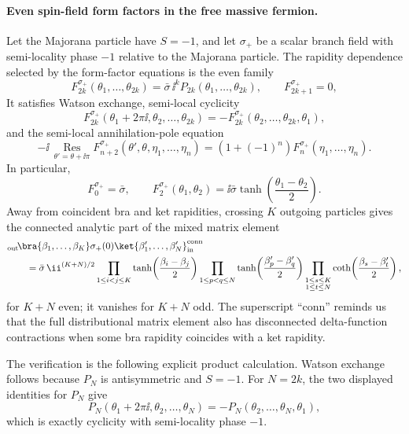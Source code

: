 \paragraph{Even spin-field form factors in the free massive fermion.}
Let the Majorana particle have \(S=-1\), and let \(\sigma_+\) be a scalar
branch field with semi-locality phase \(-1\) relative to the Majorana
particle.  The rapidity dependence selected by the form-factor equations is
the even family
\begin{equation}
  F_{2k}^{\sigma_+}(\theta_1,\ldots,\theta_{2k})
  =
  \bar\sigma\,\ii^k P_{2k}(\theta_1,\ldots,\theta_{2k}),
  \qquad
  F_{2k+1}^{\sigma_+}=0 ,
  \label{eq:ising-spin-even-form-factors}
\end{equation}
It satisfies Watson exchange, semi-local cyclicity
\[
  F_{2k}^{\sigma_+}(\theta_1+2\pi\ii,\theta_2,\ldots,\theta_{2k})
  =
  -F_{2k}^{\sigma_+}(\theta_2,\ldots,\theta_{2k},\theta_1),
\]
and the semi-local annihilation-pole equation
\[
  -\ii\,\operatorname*{Res}_{\theta'=\theta+\ii\pi}
  F_{n+2}^{\sigma_+}(\theta',\theta,\eta_1,\ldots,\eta_n)
  =
  \left(1+(-1)^n\right)
  F_n^{\sigma_+}(\eta_1,\ldots,\eta_n).
\]
In particular,
\[
  F_0^{\sigma_+}=\bar\sigma,\qquad
  F_2^{\sigma_+}(\theta_1,\theta_2)
  =
  \ii\bar\sigma
  \tanh\!\left(\frac{\theta_1-\theta_2}{2}\right).
\]
Away from coincident bra and ket rapidities, crossing \(K\) outgoing
particles gives the connected analytic part of the mixed matrix element
\begin{align}
  &{}_{\rm out}\!\bra{\beta_1,\ldots,\beta_K}
  \sigma_+(0)
  \ket{\beta'_1,\ldots,\beta'_N}_{\rm in}^{\rm conn}
  \notag\\
  &\qquad =
  \bar\sigma\,\ii^{(K+N)/2}
  \prod_{1\le i<j\le K}
  \tanh\!\left(\frac{\beta_i-\beta_j}{2}\right)
  \prod_{1\le p<q\le N}
  \tanh\!\left(\frac{\beta'_p-\beta'_q}{2}\right)
  \prod_{\substack{1\le s\le K\\1\le t\le N}}
  \coth\!\left(\frac{\beta_s-\beta'_t}{2}\right),
  \label{eq:ising-spin-mixed-fz-form-factor}
\end{align}
for \(K+N\) even; it vanishes for \(K+N\) odd.  The superscript
``conn'' reminds us that the full distributional matrix element also has
disconnected delta-function contractions when some bra rapidity coincides
with a ket rapidity.

The verification is the following explicit product calculation.  Watson
exchange follows because \(P_N\) is antisymmetric and \(S=-1\).
For \(N=2k\), the two displayed identities for \(P_N\) give
\[
  P_N(\theta_1+2\pi\ii,\theta_2,\ldots,\theta_N)
  =
  -P_N(\theta_2,\ldots,\theta_N,\theta_1),
\]
which is exactly cyclicity with semi-locality phase \(-1\).

